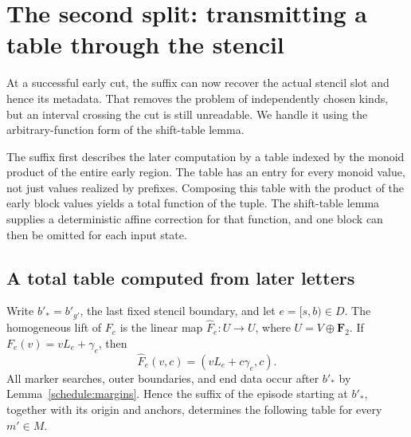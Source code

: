 \section{The second split: transmitting a table through the stencil}
\label{inner:section}

At a successful early cut, the suffix can now recover the actual stencil
slot and hence its metadata. That removes the problem of independently
chosen kinds, but an interval crossing the cut is still unreadable. We
handle it using the arbitrary-function form of the shift-table lemma.

The suffix first describes the later computation by a table indexed by
the monoid product of the entire early region. The table has an entry for
every monoid value, not just values realized by prefixes. Composing this
table with the product of the early block values yields a total
function of the tuple. The shift-table lemma supplies a deterministic
affine correction for that function, and one block can then be omitted
for each input state.

\subsection{A total table computed from later letters}

Write $b'_*=b'_{g'}$, the last fixed stencil boundary, and let
$e=[s,b)\in D$.  The homogeneous lift of $F_e$ is the linear map
$\widehat F_e\colon U\to U$, where $U=V\oplus\mathbf F_2$.
If $F_e(v)=vL_e+\gamma_e$, then
\begin{equation}
              \widehat F_e(v,c)=(vL_e+c\gamma_e,c).
 \label{inner:homogeneous-update}
\end{equation}
All marker searches, outer boundaries, and end data occur after
$b'_*$ by Lemma~\ref{schedule:margins}.  Hence the suffix of the
episode starting at $b'_*$, together with its origin and anchors,
determines the following table for every $m'\in M$.

